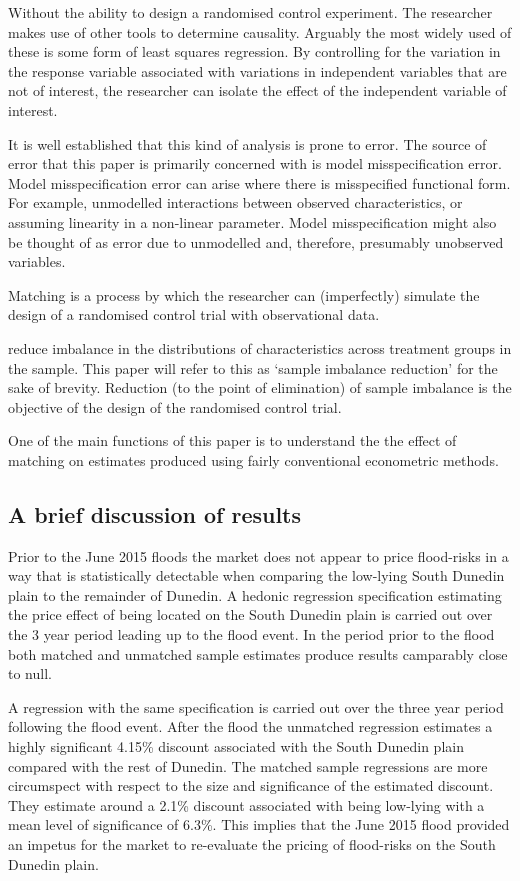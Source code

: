 \documentclass[]{article}
\begin{document}
Without the ability to design a randomised control experiment. The
researcher makes use of other tools to determine causality. Arguably the
most widely used of these is some form of least squares regression. By
controlling for the variation in the response variable associated with
variations in independent variables that are not of interest, the
researcher can isolate the effect of the independent variable of
interest.

It is well established that this kind of analysis is prone to error. The
source of error that this paper is primarily concerned with is model
misspecification error. Model misspecification error can arise where
there is misspecified functional form. For example, unmodelled
interactions between observed characteristics, or assuming linearity in
a non-linear parameter. Model misspecification might also be thought of
as error due to unmodelled and, therefore, presumably unobserved
variables.

Matching is a process by which the researcher can (imperfectly) simulate
the design of a randomised control trial with observational data.

reduce imbalance in the distributions of characteristics across
treatment groups in the sample. This paper will refer to this as `sample
imbalance reduction' for the sake of brevity. Reduction (to the point of
elimination) of sample imbalance is the objective of the design of the
randomised control trial.

One of the main functions of this paper is to understand the the effect
of matching on estimates produced using fairly conventional econometric
methods.

\subsection{A brief discussion of
results}\label{a-brief-discussion-of-results}

Prior to the June 2015 floods the market does not appear to price
flood-risks in a way that is statistically detectable when comparing the
low-lying South Dunedin plain to the remainder of Dunedin. A hedonic
regression specification estimating the price effect of being located on
the South Dunedin plain is carried out over the 3 year period leading up
to the flood event. In the period prior to the flood both matched and
unmatched sample estimates produce results camparably close to null.

A regression with the same specification is carried out over the three
year period following the flood event. After the flood the unmatched
regression estimates a highly significant 4.15\% discount associated
with the South Dunedin plain compared with the rest of Dunedin. The
matched sample regressions are more circumspect with respect to the size
and significance of the estimated discount. They estimate around a 2.1\%
discount associated with being low-lying with a mean level of
significance of 6.3\%. This implies that the June 2015 flood provided an
impetus for the market to re-evaluate the pricing of flood-risks on the
South Dunedin plain.
\end{document}
